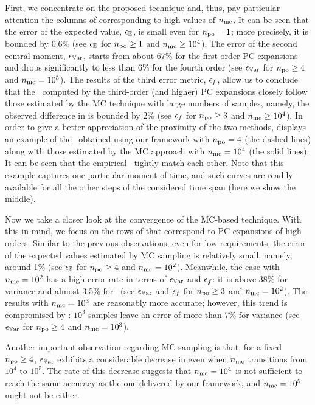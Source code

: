 

First, we concentrate on the proposed technique and, thus, pay particular attention the columns of  corresponding to high values of ${n_\text{mc}}$.
It can be seen that the error of the expected value, $\epsilon_\mathbb{E}$, is small even for ${n_\text{po}} = 1$; more precisely, it is bounded by 0.6\% (see $\epsilon_\mathbb{E}$ for ${n_\text{po}} \geq 1$ and ${n_\text{mc}} \geq 10^4$).
The error of the second central moment, $\epsilon_{\mathbb{V}\text{ar}}$, starts from about 67\% for the first-order PC expansions and drops significantly to less than 6\% for the fourth order (see $\epsilon_{\mathbb{V}\text{ar}}$ for ${n_\text{po}} \geq 4$ and ${n_\text{mc}} = 10^5$).
The results of the third error metric, $\epsilon_f$, allow us to conclude that the \pdfs\ computed by the third-order (and higher) PC expansions closely follow those estimated by the MC technique with large numbers of samples, namely, the observed difference in  is bounded by 2\% (see $\epsilon_f$ for ${n_\text{po}} \geq 3$ and ${n_\text{mc}} \geq 10^4$).
In order to give a better appreciation of the proximity of the two methods,  displays an example of the \pdfs\ obtained using our framework with ${n_\text{po}} = 4$ (the dashed lines) along with those estimated by the MC approach with ${n_\text{mc}} = 10^4$ (the solid lines).
It can be seen that the empirical \pdfs\ tightly match each other.
Note that this example captures one particular moment of time, and such curves are readily available for all the other steps of the considered time span (here we show the middle).

Now we take a closer look at the convergence of the MC-based technique.
With this in mind, we focus on the rows of  that correspond to PC expansions of high orders.
Similar to the previous observations, even for low requirements, the error of the expected values estimated by MC sampling is relatively small, namely, around 1\% (see $\epsilon_\mathbb{E}$ for ${n_\text{po}} \geq 4$ and ${n_\text{mc}} = 10^2$).
Meanwhile, the case with ${n_\text{mc}} = 10^2$ has a high error rate in terms of $\epsilon_{\mathbb{V}\text{ar}}$ and $\epsilon_f$: it is above 38\% for variance and almost 3.5\% for \pdfs\ (see $\epsilon_{\mathbb{V}\text{ar}}$ and $\epsilon_f$ for ${n_\text{po}} \geq 3$ and ${n_\text{mc}} = 10^2$).
The results with ${n_\text{mc}} = 10^3$ are reasonably more accurate; however, this trend is compromised by : $10^3$ samples leave an error of more than 7\% for variance (see $\epsilon_{\mathbb{V}\text{ar}}$ for ${n_\text{po}} \geq 4$ and ${n_\text{mc}} = 10^3$).

Another important observation regarding MC sampling is that, for a fixed ${n_\text{po}} \geq 4$, $\epsilon_{\mathbb{V}\text{ar}}$ exhibits a considerable decrease in  even when ${n_\text{mc}}$ transitions from $10^4$ to $10^5$.
The rate of this decrease suggests that ${n_\text{mc}} = 10^4$ is not sufficient to reach the same accuracy as the one delivered by our framework, and ${n_\text{mc}} = 10^5$ might not be either.

